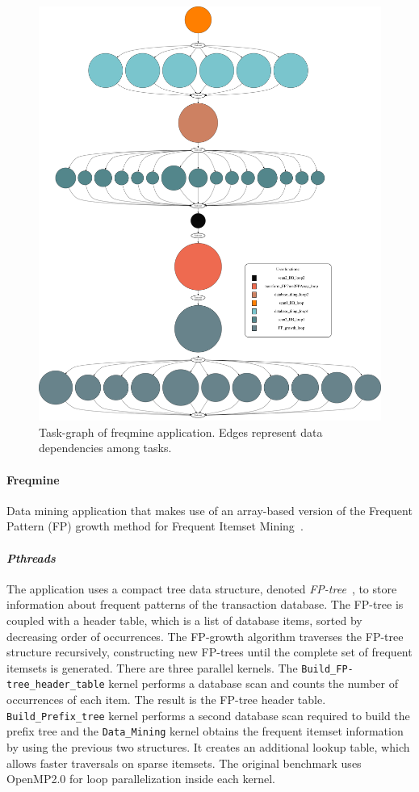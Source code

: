 {\begin{figure}[t!]%
	\center
	\includegraphics[width=.8\columnwidth]{ifcg/figures/freqmine_taskgraph}%
	\caption{Task-graph of freqmine application.  Edges represent data dependencies among
tasks.}
	\label{fig:freqmine_tg}%
	\vspace{.5cm}
\end{figure}

\paragraph{\textbf{Freqmine}}
Data mining application that makes use of an array-based version of the Frequent Pattern
(FP) growth method for Frequent Itemset Mining~\cite{conf/fimi/GrahneZ03}.

\paragraph{\textit{Pthreads}}
The application uses a compact tree data structure, denoted \emph{FP-tree}~\cite{Han:2000:MFP:335191.335372}, to store information about frequent patterns of the transaction database.  The FP-tree is coupled with a header table, which is a list of database items, sorted by decreasing order of occurrences.
The FP-growth algorithm traverses the FP-tree structure recursively, constructing new FP-trees until the complete set of frequent itemsets is generated.
There are three parallel kernels.  The \texttt{Build\_FP-tree\_header\_table} kernel performs a database scan 
and counts the number of occurrences of each item.  The result is the FP-tree header table.   
\texttt{Build\_Prefix\_tree} kernel performs a second database scan required to build the prefix tree
and the \texttt{Data\_Mining} kernel obtains the frequent itemset information by using the previous two structures.  It creates
an additional lookup table, which allows faster traversals on sparse itemsets.
The original \PARSEC{} benchmark uses OpenMP2.0 for loop parallelization inside each kernel.  

}
